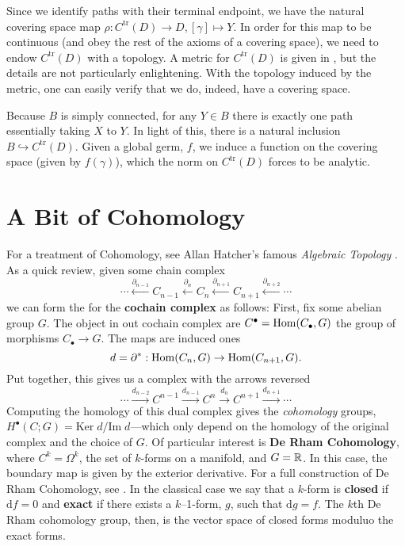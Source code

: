Since we identify paths with their terminal endpoint, we have the natural
covering space map \(\rho: C^{\textrm{tr}}(D) \to D, [\gamma]\mapsto Y\). In order
for this map to be continuous (and obey the rest of the axioms of a covering
space), we need to endow \(C^{\textrm{tr}}(D)\) with a topology. A metric for
\(C^{\textrm{tr}}(D)\) is given in
\cite{pascoeFreeNoncommutativePrincipal2020}, but the details are not
particularly enlightening. With the topology induced by the metric, one can
easily verify that we do, indeed, have a covering space.

Because \(B\) is simply connected, for any \(Y \in B\) there is exactly one path
essentially taking \(X\) to \(Y\). In light of this, there is a natural
inclusion \(B \hookrightarrow C^{\textrm{tr}}(D)\). Given a global germ, \(f\),
we induce a function on the covering space (given by \(f(\gamma)\)), which the
norm on \(C^{\textrm{tr}}(D)\) forces to be analytic.

\section{A Bit of Cohomology}%
\label{sec:cohomo}

For a treatment of Cohomology, see Allan Hatcher's famous
\emph{Algebraic Topology} \cite{hatcherAlgebraic2002}. As a quick review, given
some chain complex
\[
  \cdots
  \xleftarrow{\partial_{n-1}}
  C_{n-1}
  \xleftarrow{\partial_{n}}
  C_{n}
  \xleftarrow{\partial_{n+1}}
  C_{n+1}
  \xleftarrow{\partial_{n+2}}
  \cdots
\]
we can form the for the \textbf{cochain complex} as follows: First, fix some
abelian group \(G\). The object in out cochain complex are
\(C^\bullet = \operatorname{Hom} (C_\bullet, G)\) the group of morphisms \(C_\bullet \to G\).
The maps are induced ones
\[
  d = \partial^* : \operatorname{Hom}(C_n,G) \to \operatorname{Hom}(C_{n+1},G).
\]
Put together, this gives us a complex with the arrows reversed
\[
  \cdots
  \xrightarrow{d_{n-2}}
  C^{n-1}
  \xrightarrow{d_{n-1}}
  C^{n}
  \xrightarrow{d_{n}}
  C^{n+1}
  \xrightarrow{d_{n+1}}
  \cdots
\]
Computing the homology of this dual complex gives the \emph{cohomology}
groups, \(H^\bullet (C; G)= \textrm{Ker}\;  d / \textrm{Im}\; d\)---which only
depend on the homology of the original complex and the choice of \(G\). Of
particular interest is \textbf{De Rham Cohomology}, where \(C^k = \Omega^k\), the
set of \(k\)-forms on a manifold, and \(G=\mathbb{R} \). In this case, the boundary map
is given by the exterior derivative. For a full construction of De Rham
Cohomology, see \cite{leeIntroduction2013}. In the classical case we say that a
\(k\)-form is \textbf{closed} if \(\text{d} f =0\) and \textbf{exact} if there
exists a \(k\)--1-form, \(g\), such that \(\text{d} g=f\). The \(k\)th De Rham
cohomology group, then, is the vector space of closed forms moduluo the exact
forms.


